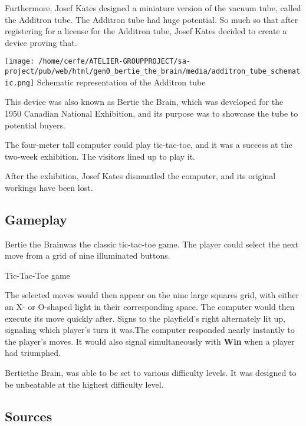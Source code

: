 \documentclass[a4paper,10pt]{book}
\begin{document}
 Furthermore, Josef Kates designed a miniature version of the vacuum tube, called the Additron tube. 
            The Additron tube had huge potential. So much so that after registering for a license for the Additron tube, Josef Kates decided to create a device proving that.
           
 
 \texttt{[image: /home/cerfe/ATELIER-GROUPPROJECT/sa-project/pub/web/html/gen0\_bertie\_the\_brain/media/additron\_tube\_schematic.png]}
 Schematic representation of the Additron tube 
 
 
            This device was also known as Bertie the Brain, which was developed for the 1950 Canadian National Exhibition, and its purpose was to showcase the tube to potential buyers. 
           
 
            The four-meter tall computer could play tic-tac-toe, and it was a success at the two-week exhibition. The visitors lined up to play it.
           
 
            After the exhibition, Josef Kates dismantled the computer, and its original workings have been lost.
           
 
 \subsection{Gameplay }
 
          Bertie the Brainwas the classic tic-tac-toe game. The player could select the next move from a grid of nine illuminated buttons.
           
 
 
 Tic-Tac-Toe game 
 
 
            The selected moves would then appear on the nine large squares grid, with either an X- or O-shaped light in their corresponding space.  
            The computer would then execute its move quickly after. Signs to the playfield's right alternately lit up, signaling which player's turn it was.The computer responded nearly instantly to the player's moves. 
            It would also signal simultaneously with  \textbf{Win }  when a player had triumphed.
           
 
            Bertiethe Brain, was able to be set to various difficulty levels. It was designed to be unbeatable at the highest difficulty level.
           
 
 \subsection{Sources }
 
\end{document}
